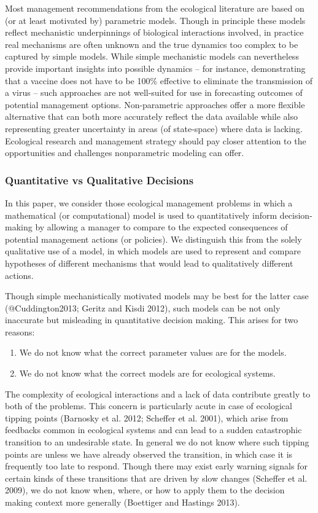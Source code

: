 \documentclass[author-year, review]{elsarticle} %
\begin{document}
Most management recommendations from the ecological literature are based
on (or at least motivated by) parametric models. Though in principle
these models reflect mechanistic underpinnings of biological
interactions involved, in practice real mechanisms are often unknown and
the true dynamics too complex to be captured by simple models. While
simple mechanistic models can nevertheless provide important insights
into possible dynamics -- for instance, demonstrating that a vaccine
does not have to be 100\% effective to eliminate the transmission of a
virus -- such approaches are not well-suited for use in forecasting
outcomes of potential management options. Non-parametric approaches
offer a more flexible alternative that can both more accurately reflect
the data available while also representing greater uncertainty in areas
(of state-space) where data is lacking. Ecological research and
management strategy should pay closer attention to the opportunities and
challenges nonparametric modeling can offer.

\subsubsection{Quantitative vs Qualitative Decisions}

In this paper, we consider those ecological management problems in which
a mathematical (or computational) model is used to quantitatively inform
decision-making by allowing a manager to compare to the expected
consequences of potential management actions (or policies). We
distinguish this from the solely qualitative use of a model, in which
models are used to represent and compare hypotheses of different
mechanisms that would lead to qualitatively different actions.

Though simple mechanistically motivated models may be best for the
latter case (@Cuddington2013; Geritz and Kisdi 2012), such models can be
not only inaccurate but misleading in quantitative decision making. This
arises for two reasons:

\begin{enumerate}
\def\labelenumi{\arabic{enumi}.}
\itemsep1pt\parskip0pt
\item
  We do not know what the correct parameter values are for the models.
\item
  We do not know what the correct models are for ecological systems.
\end{enumerate}

The complexity of ecological interactions and a lack of data contribute
greatly to both of the problems. This concern is particularly acute in
case of ecological tipping points (Barnosky et al. 2012; Scheffer et al.
2001), which arise from feedbacks common in ecological systems and can
lead to a sudden catastrophic transition to an undesirable state. In
general we do not know where such tipping points are unless we have
already observed the transition, in which case it is frequently too late
to respond. Though there may exist early warning signals for certain
kinds of these transitions that are driven by slow changes (Scheffer et
al. 2009), we do not know when, where, or how to apply them to the
decision making context more generally (Boettiger and Hastings 2013).
\end{document}
